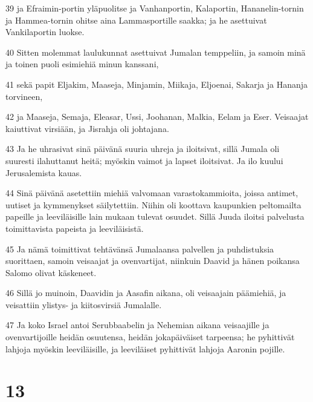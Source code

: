 \par 39 ja Efraimin-portin yläpuolitse ja Vanhanportin, Kalaportin, Hananelin-tornin ja Hammea-tornin ohitse aina Lammasportille saakka; ja he asettuivat Vankilaportin luokse.
\par 40 Sitten molemmat laulukunnat asettuivat Jumalan temppeliin, ja samoin minä ja toinen puoli esimiehiä minun kanssani,
\par 41 sekä papit Eljakim, Maaseja, Minjamin, Miikaja, Eljoenai, Sakarja ja Hananja torvineen,
\par 42 ja Maaseja, Semaja, Eleasar, Ussi, Joohanan, Malkia, Eelam ja Eser. Veisaajat kaiuttivat virsiään, ja Jisrahja oli johtajana.
\par 43 Ja he uhrasivat sinä päivänä suuria uhreja ja iloitsivat, sillä Jumala oli suuresti ilahuttanut heitä; myöskin vaimot ja lapset iloitsivat. Ja ilo kuului Jerusalemista kauas.
\par 44 Sinä päivänä asetettiin miehiä valvomaan varastokammioita, joissa antimet, uutiset ja kymmenykset säilytettiin. Niihin oli koottava kaupunkien peltomailta papeille ja leeviläisille lain mukaan tulevat osuudet. Sillä Juuda iloitsi palvelusta toimittavista papeista ja leeviläisistä.
\par 45 Ja nämä toimittivat tehtävänsä Jumalaansa palvellen ja puhdistuksia suorittaen, samoin veisaajat ja ovenvartijat, niinkuin Daavid ja hänen poikansa Salomo olivat käskeneet.
\par 46 Sillä jo muinoin, Daavidin ja Aasafin aikana, oli veisaajain päämiehiä, ja veisattiin ylistys- ja kiitosvirsiä Jumalalle.
\par 47 Ja koko Israel antoi Serubbaabelin ja Nehemian aikana veisaajille ja ovenvartijoille heidän osuutensa, heidän jokapäiväiset tarpeensa; he pyhittivät lahjoja myöskin leeviläisille, ja leeviläiset pyhittivät lahjoja Aaronin pojille.

\chapter{13}

